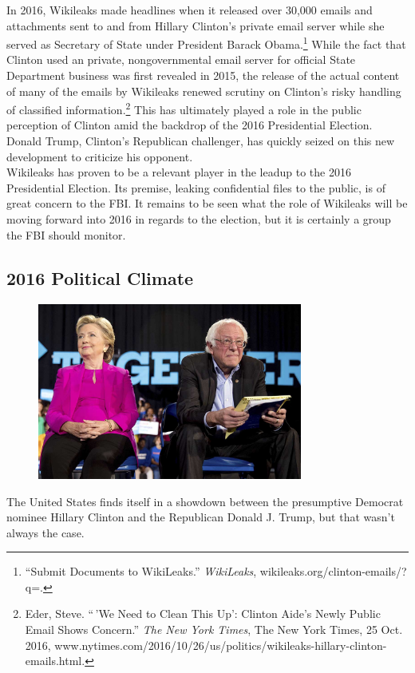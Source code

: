 \documentclass[10pt, letterpaper]{article}
\begin{document}
In 2016, Wikileaks made headlines when it released over 30,000 emails
and attachments sent to and from Hillary Clinton's private email server
while she served as Secretary of State under President Barack
Obama.\footnote{``Submit Documents to WikiLeaks.'' \emph{WikiLeaks},
  wikileaks.org/clinton-emails/?q=.} While the fact that Clinton used an
private, nongovernmental email server for official State Department
business was first revealed in 2015, the release of the actual content
of many of the emails by Wikileaks renewed scrutiny on Clinton's risky
handling of classified information.\footnote{Eder, Steve. ``\,'We Need
  to Clean This Up': Clinton Aide's Newly Public Email Shows Concern.''
  \emph{The New York Times}, The New York Times, 25 Oct. 2016,
  www.nytimes.com/2016/10/26/us/politics/wikileaks-hillary-clinton-emails.html.}
This has ultimately played a role in the public perception of Clinton
amid the backdrop of the 2016 Presidential Election. Donald Trump,
Clinton's Republican challenger, has quickly seized on this new
development to criticize his opponent. \\

Wikileaks has proven to be a relevant player in the leadup to the 2016
Presidential Election. Its premise, leaking confidential files to the
public, is of great concern to the FBI. It remains to be seen what the
role of Wikileaks will be moving forward into 2016 in regards to the
election, but it is certainly a group the FBI should monitor. \\

\subsection{2016 Political Climate}

\begin{figure}
\centering
\includegraphics[width=3.42969in,height=2.28646in]{image3.jpg} \\
\end{figure}
The United States finds itself in a showdown between the presumptive
Democrat nominee Hillary Clinton and the Republican Donald J. Trump, but
that wasn't always the case.
\end{document}
